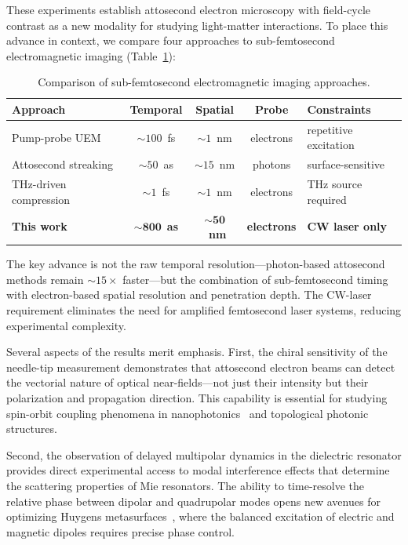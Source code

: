 \documentclass[12pt]{article}
\begin{document}
These experiments establish attosecond electron microscopy with field-cycle contrast as a new modality for studying light-matter interactions. To place this advance in context, we compare four approaches to sub-femtosecond electromagnetic imaging (Table~\ref{tab:comparison}):

\begin{table}[htbp]
    \centering
    \caption{Comparison of sub-femtosecond electromagnetic imaging approaches.}
    \label{tab:comparison}
    \begin{tabular}{lcccl}
        \toprule
        Approach & Temporal & Spatial & Probe & Constraints \\
        \midrule
        Pump-probe UEM~\cite{Zewail2010,Zhu2014} & ${\sim}100$~fs & ${\sim}1$~nm & electrons & repetitive excitation \\
        Attosecond streaking~\cite{Hentschel2001,Krausz2009} & ${\sim}50$~as & ${\sim}15$~nm & photons & surface-sensitive \\
        THz-driven compression~\cite{Ryabov2016} & ${\sim}1$~fs & ${\sim}1$~nm & electrons & THz source required \\
        \textbf{This work} & $\mathbf{{\sim}800}$~\textbf{as} & $\mathbf{{\sim}50}$~\textbf{nm} & \textbf{electrons} & \textbf{CW laser only} \\
        \bottomrule
    \end{tabular}
\end{table}

The key advance is not the raw temporal resolution---photon-based attosecond methods remain ${\sim}15\times$ faster---but the combination of sub-femtosecond timing with electron-based spatial resolution and penetration depth. The CW-laser requirement eliminates the need for amplified femtosecond laser systems, reducing experimental complexity.

Several aspects of the results merit emphasis. First, the chiral sensitivity of the needle-tip measurement demonstrates that attosecond electron beams can detect the vectorial nature of optical near-fields---not just their intensity but their polarization and propagation direction. This capability is essential for studying spin-orbit coupling phenomena in nanophotonics~\cite{Bliokh2015} and topological photonic structures.

Second, the observation of delayed multipolar dynamics in the dielectric resonator provides direct experimental access to modal interference effects that determine the scattering properties of Mie resonators. The ability to time-resolve the relative phase between dipolar and quadrupolar modes opens new avenues for optimizing Huygens metasurfaces~\cite{Decker2015}, where the balanced excitation of electric and magnetic dipoles requires precise phase control.
\end{document}
